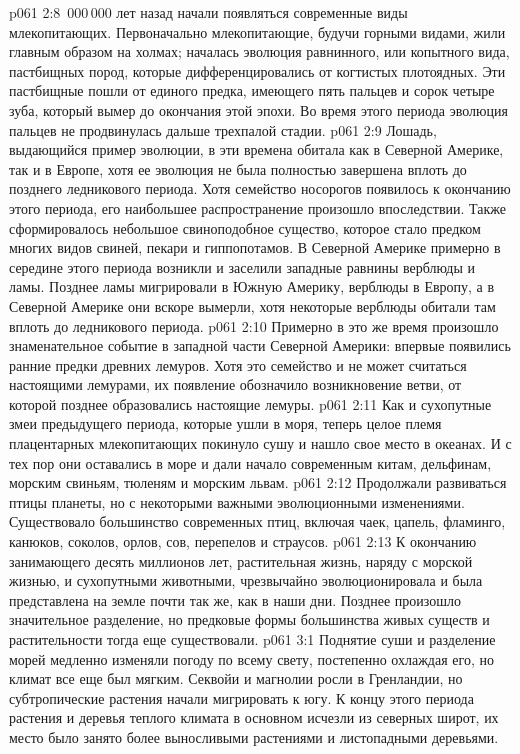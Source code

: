 \vs p061 2:8 \,000\,000 лет назад начали появляться современные виды млекопитающих. Первоначально млекопитающие, будучи горными видами, жили главным образом на холмах;  началась эволюция равнинного, или копытного вида, пастбищных пород, которые дифференцировались от когтистых плотоядных. Эти пастбищные пошли от единого предка, имеющего пять пальцев и сорок четыре зуба, который вымер до окончания этой эпохи. Во время этого периода эволюция пальцев не продвинулась дальше трехпалой стадии.
\vs p061 2:9 Лошадь, выдающийся пример эволюции, в эти времена обитала как в Северной Америке, так и в Европе, хотя ее эволюция не была полностью завершена вплоть до позднего ледникового периода. Хотя семейство носорогов появилось к окончанию этого периода, его наибольшее распространение произошло впоследствии. Также сформировалось небольшое свиноподобное существо, которое стало предком многих видов свиней, пекари и гиппопотамов. В Северной Америке примерно в середине этого периода возникли и заселили западные равнины верблюды и ламы. Позднее ламы мигрировали в Южную Америку, верблюды в Европу, а в Северной Америке они вскоре вымерли, хотя некоторые верблюды обитали там вплоть до ледникового периода.
\vs p061 2:10 Примерно в это же время произошло знаменательное событие в западной части Северной Америки: впервые появились ранние предки древних лемуров. Хотя это семейство и не может считаться настоящими лемурами, их появление обозначило возникновение ветви, от которой позднее образовались настоящие лемуры.
\vs p061 2:11 Как и сухопутные змеи предыдущего периода, которые ушли в моря, теперь целое племя плацентарных млекопитающих покинуло сушу и нашло свое место в океанах. И с тех пор они оставались в море и дали начало современным китам, дельфинам, морским свиньям, тюленям и морским львам.
\vs p061 2:12 Продолжали развиваться птицы планеты, но с некоторыми важными эволюционными изменениями. Существовало большинство современных птиц, включая чаек, цапель, фламинго, канюков, соколов, орлов, сов, перепелов и страусов.
\vs p061 2:13 \pc К окончанию  занимающего десять миллионов лет, растительная жизнь, наряду с морской жизнью, и сухопутными животными, чрезвычайно эволюционировала и была представлена на земле почти так же, как в наши дни. Позднее произошло значительное разделение, но предковые формы большинства живых существ и растительности тогда еще существовали.
\vs p061 3:1 Поднятие суши и разделение морей медленно изменяли погоду по всему свету, постепенно охлаждая его, но климат все еще был мягким. Секвойи и магнолии росли в Гренландии, но субтропические растения начали мигрировать к югу. К концу этого периода растения и деревья теплого климата в основном исчезли из северных широт, их место было занято более выносливыми растениями и листопадными деревьями.
